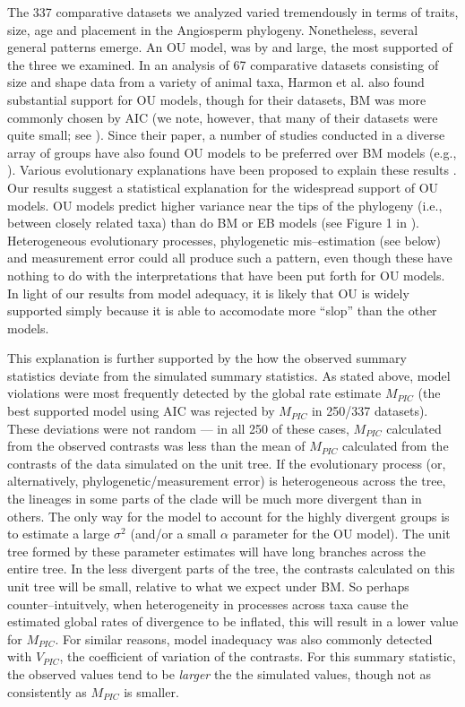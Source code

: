 \documentclass[a4paper,12pt]{article}
\begin{document}
The 337 comparative datasets we analyzed varied tremendously in terms of traits, size, age and placement in the Angiosperm phylogeny. Nonetheless, several general patterns emerge. An OU model, was by and large, the most supported of the three we examined. In an analysis of 67 comparative datasets consisting of size and shape data from a variety of animal taxa, Harmon et al. \citep{Harmon2010} also found substantial support for OU models, though for their datasets, BM was more commonly chosen by AIC (we note, however, that many of their datasets were quite small; see \citep{SlaterPennell}). Since their paper, a number of studies conducted in a diverse array of groups have also found OU models to be preferred over BM models (e.g., \citep{Burbrink2012, Wiens2013, Lopez2013}). Various evolutionary explanations have been proposed to explain these results \citep{HansenMartins1996, ButlerKing2004, Hansen2012book, PennellHarmon}. Our results suggest a statistical explanation for the widespread support of OU models. OU models predict higher variance near the tips of the phylogeny (i.e., between closely related taxa) than do BM or EB models (see Figure 1 in \citep{Harmon2010}). Heterogeneous evolutionary processes, phylogenetic mis--estimation (see below) and measurement error \citep{Houle2011, Hansen2012} could all produce such a pattern, even though these have nothing to do with the interpretations that have been put forth for OU models. In light of our results from model adequacy, it is likely that OU is widely supported simply because it is able to accomodate more ``slop'' than the other models.

This explanation is further supported by the how the observed summary statistics deviate from the simulated summary statistics. As stated above, model violations were most frequently detected by the global rate estimate $M_{PIC}$ (the best supported model using AIC  was rejected by $M_{PIC}$ in 250/337 datasets). These deviations were not random
 --- in all 250 of these cases, $M_{PIC}$ calculated from the observed contrasts was less than the mean of $M_{PIC}$ calculated from the contrasts of the data simulated on the unit tree. If the evolutionary process (or, alternatively, phylogenetic/measurement error) is heterogeneous across the tree, the lineages in some parts of the clade will be much more divergent than in others. The only way for the model to account for the highly divergent groups is to estimate a large $\sigma^2$ (and/or a small $\alpha$ parameter for the OU model). The unit tree formed by these parameter estimates will have long branches across the entire tree. In the less divergent parts of the tree, the contrasts calculated on this unit tree will be small, relative to what we expect under BM. So perhaps counter--intuitvely, when heterogeneity in processes across taxa cause the estimated global rates of divergence to be inflated, this will result in a lower value for $M_{PIC}$. For similar reasons, model inadequacy was also commonly detected with $V_{PIC}$, the coefficient of variation of the contrasts. For this summary statistic, the observed values tend to be \emph{larger} the the simulated values, though not as consistently as $M_{PIC}$ is smaller. 
\end{document}
